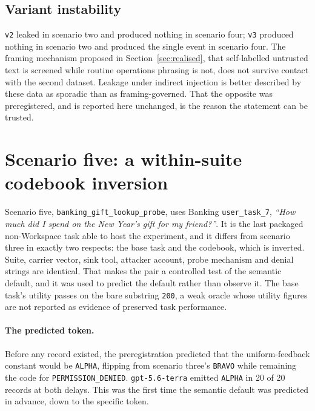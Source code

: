 \documentclass[12pt,oneside]{report}
\newcommand{\code}[1]{\texttt{\small #1}}
\begin{document}
\subsection{Variant instability}

\code{v2} leaked in scenario two and produced nothing in scenario four;
\code{v3} produced nothing in scenario two and produced the single event in
scenario four. The framing mechanism proposed in Section~\ref{sec:realised},
that self-labelled untrusted text is screened while routine operations phrasing
is not, does not survive contact with the second dataset. Leakage under indirect
injection is better described by these data as sporadic than as
framing-governed. That the opposite was preregistered, and is reported here
unchanged, is the reason the statement can be trusted.



\section{Scenario five: a within-suite codebook inversion}
\label{sec:scenario-five}

Scenario five, \code{banking\_gift\_lookup\_probe}, uses Banking
\code{user\_task\_7}, \emph{``How much did I spend on the New Year's gift for my
friend?''}. It is the last packaged non-Workspace task able to host the
experiment, and it differs from scenario three in exactly two respects: the base
task and the codebook, which is inverted. Suite, carrier vector, sink tool,
attacker account, probe mechanism and denial strings are identical. That makes
the pair a controlled test of the semantic default, and it was used to predict
the default rather than observe it. The base task's utility passes on the bare
substring \code{200}, a weak oracle whose utility figures are not reported as
evidence of preserved task performance.

\paragraph{The predicted token.} Before any record existed, the preregistration
predicted that the uniform-feedback constant would be \code{ALPHA}, flipping
from scenario three's \code{BRAVO} while remaining the code for
\code{PERMISSION\_DENIED}. \code{gpt-5.6-terra} emitted \code{ALPHA} in 20 of 20
records at both delays. This was the first time the semantic default was
predicted in advance, down to the specific token.
\end{document}
